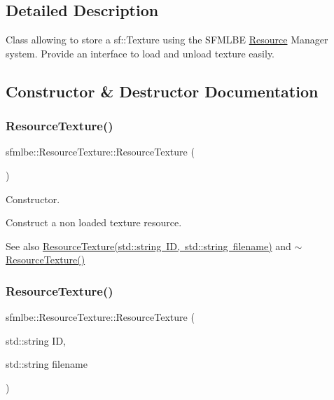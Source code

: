 \subsection{Detailed Description}
Class allowing to store a sf\+::\+Texture using the S\+F\+M\+L\+BE \mbox{\hyperlink{classsfmlbe_1_1_resource}{Resource}} Manager system. Provide an interface to load and unload texture easily. 

\subsection{Constructor \& Destructor Documentation}
\mbox{\label{classsfmlbe_1_1_resource_texture_aa1a489c8fe125057b3009f6615093118}} 
\subsubsection{\texorpdfstring{Resource\+Texture()}{ResourceTexture()}\hspace{0.1cm}{\footnotesize\ttfamily [1/2]}}
{\footnotesize\ttfamily sfmlbe\+::\+Resource\+Texture\+::\+Resource\+Texture (\begin{DoxyParamCaption}{ }\end{DoxyParamCaption})}



Constructor. 

Construct a non loaded texture resource. \begin{DoxySeeAlso}{See also}
\mbox{\hyperlink{classsfmlbe_1_1_resource_texture_a458e1b22fd5074534d86f2665637ae34}{Resource\+Texture(std\+::string I\+D, std\+::string filename)}} and \mbox{\hyperlink{classsfmlbe_1_1_resource_texture_a98789b46742a42adffffe0abed982184}{$\sim$\+Resource\+Texture()}} 
\end{DoxySeeAlso}
\mbox{\label{classsfmlbe_1_1_resource_texture_a458e1b22fd5074534d86f2665637ae34}} 
\subsubsection{\texorpdfstring{Resource\+Texture()}{ResourceTexture()}\hspace{0.1cm}{\footnotesize\ttfamily [2/2]}}
{\footnotesize\ttfamily sfmlbe\+::\+Resource\+Texture\+::\+Resource\+Texture (\begin{DoxyParamCaption}\item[{std\+::string}]{ID,  }\item[{std\+::string}]{filename }\end{DoxyParamCaption})}



